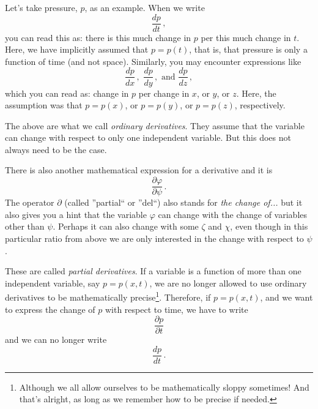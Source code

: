 Let's take pressure, $p$, as an example. When we write
\begin{equation*}\label{eq:change-p}
\frac{d p}{d t} \, ,
\end{equation*}
you can read this as: there is this much change in $p$ per this much change in $t$. Here, we have implicitly assumed that $p = p(t)$, that is, that pressure is only a function of time (and not space).
Similarly, you may encounter expressions like
\begin{equation*}\label{eq:change-p}
\frac{d p}{d x} \,  , \,\, \frac{d p}{d y} \, , \,\, \text{and} \,\, \frac{d p}{d z} \, ,
\end{equation*}
which you can read as: change in $p$ per change in $x$, or $y$, or $z$. 
Here, the assumption was that $p = p(x)$, or $p = p(y)$, or $p = p(z)$, respectively.

The above are what we call \textit{ordinary derivatives}. They assume that the variable can change with respect to only one independent variable. But this does not always need to be the case. 

There is also another mathematical expression for a derivative and it is
\begin{equation*}\label{eq:change-partial}
\frac{\partial \varphi}{\partial \psi} \, .
\end{equation*}
The operator $\partial$ (called ''partial`` or ''del``) also stands for \textit{the change of...} but it also gives you a hint that the variable $\varphi$ can change with the change of variables other than $\psi$. Perhaps it can also change with some $\zeta$ and $\chi$, even though in this particular ratio from above we are only interested in the change with respect to $\psi$.

These are called \textit{partial derivatives}. If a variable is a function of more than one independent variable, say $p = p(x,t)$, we are no longer allowed to use ordinary derivatives to be mathematically precise\footnote{Although we all allow ourselves to be mathematically sloppy sometimes! And that's alright, as long as we remember how to be precise if needed.}. Therefore, if $p = p(x,t)$, and we want to express the change of $p$ with respect to time, we have to write
\begin{equation*}\label{eq:change-partial}
\frac{\partial p}{\partial t}
\end{equation*}
and we can no longer write
\begin{equation*}\label{eq:change-partial}
\frac{d p}{d t} \, .
\end{equation*}


